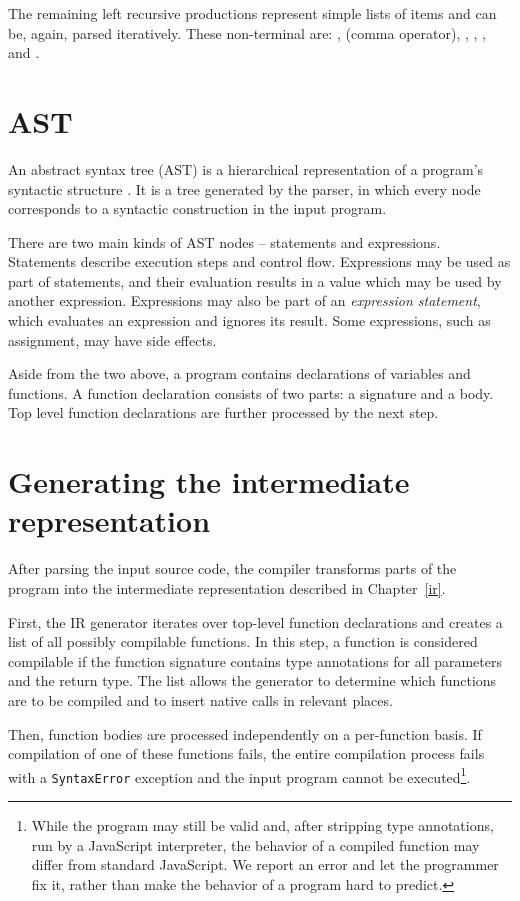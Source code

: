 The remaining left recursive productions represent simple lists of items and can be, again, parsed iteratively. These non-terminal are: \nonterminal[FormalParameters]{}{}, \nonterminal[Expression]{}{} (comma operator), \nonterminal[LexicalDeclaration]{}{}, \nonterminal[VariableDeclaration]{}{}, \nonterminal[Arguments]{}{}, and \nonterminal[StatementList]{}{}.


\section{AST}

An abstract syntax tree (AST) is a hierarchical representation of a program's syntactic structure \cite{dragon}. It is a tree generated by the parser, in which every node corresponds to a syntactic construction in the input program.

There are two main kinds of AST nodes -- statements and expressions. Statements describe execution steps and control flow. Expressions may be used as part of statements, and their evaluation results in a value which may be used by another expression. Expressions may also be part of an \textit{expression statement}, which evaluates an expression and ignores its result. Some expressions, such as assignment, may have side effects.

Aside from the two above, a program contains declarations of variables and functions. A function declaration consists of two parts: a signature and a body. Top level function declarations are further processed by the next step.


\section{Generating the intermediate representation}

After parsing the input source code, the compiler transforms parts of the program into the intermediate representation described in Chapter~\ref{ir}.

First, the IR generator iterates over top-level function declarations and creates a list of all possibly compilable functions. In this step, a function is considered compilable if the function signature contains type annotations for all parameters and the return type. The list allows the generator to determine which functions are to be compiled and to insert native calls in relevant places.

Then, function bodies are processed independently on a per-function basis. If compilation of one of these functions fails, the entire compilation process fails with a \texttt{SyntaxError} exception and the input program cannot be executed\footnote{While the program may still be valid and, after stripping type annotations, run by a JavaScript interpreter, the behavior of a compiled function may differ from standard JavaScript. We report an error and let the programmer fix it, rather than make the behavior of a program hard to predict.}.

